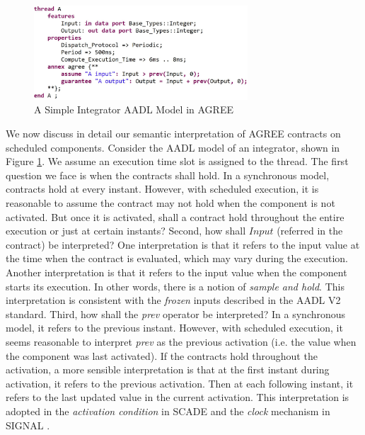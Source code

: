 \begin{figure}[t!]
\centering
\includegraphics[width=80mm]{pre.jpg}
\caption{A Simple Integrator AADL Model in AGREE\label{integratorFig}}
\end{figure}

We now discuss in detail our semantic interpretation of AGREE contracts on scheduled components.
Consider the AADL model of an integrator, shown in Figure \ref{integratorFig}. We assume an execution time slot is assigned to the thread.  
The first question we face is when the contracts shall hold. In a synchronous model, contracts hold at every instant. However, with scheduled execution, it is reasonable to assume the contract may not hold when the component is not activated. But once it is activated, shall a contract hold throughout the entire execution or just at certain instants? Second, how shall $Input$ (referred in the contract) be interpreted? One interpretation is that it refers to the input value at the time when the contract is evaluated, which may vary during the execution. Another interpretation is that it refers to the input value when the component starts its execution. In other words, there is a notion of \emph{sample and hold}. This interpretation is consistent with the \emph{frozen} inputs described in the AADL V2 standard. Third, how shall the \emph{prev} operator be interpreted? In a synchronous model, it refers to the previous instant. However, with scheduled execution, it seems reasonable to interpret \emph{prev} as the previous activation (i.e. the value when the component was last activated). If the contracts hold throughout the activation, a more sensible interpretation is that at the first instant during activation, it refers to the previous activation. Then at each following instant, it refers to the last updated value in the current activation. This interpretation is adopted in the \emph{activation condition} in SCADE \cite{scade} and the \emph{clock} mechanism in SIGNAL \cite{signal}.

